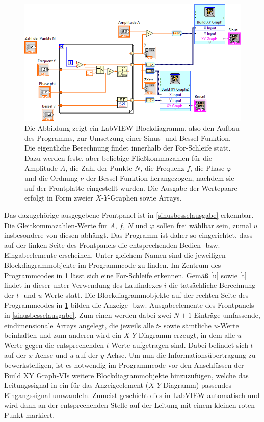 \documentclass[
a4paper,
12pt,
pagesize,
ngerman
]{scrartcl}
\begin{document}
	\begin{figure}[H]
		\centering
		\includegraphics[width=1.0\textwidth]{EIRE2018Dateien/Tag1/sinusbessel-bilder/SinusBesseld}
		\caption{Die Abbildung zeigt ein LabVIEW-Blockdiagramm, also den Aufbau des Programms, zur Umsetzung einer Sinus- und Bessel-Funktion. Die eigentliche Berechnung findet innerhalb der For-Schleife statt. Dazu werden feste, aber beliebige Fließkommazahlen für die Amplitude $A$, die Zahl der Punkte $N$, die Frequenz $f$, die Phase $\varphi$ und die Ordnung $\nu$ der Bessel-Funktion herangezogen, nachdem sie auf der Frontplatte eingestellt wurden. Die Ausgabe der Wertepaare erfolgt in Form zweier $X$-$Y$-Graphen sowie Arrays.}
		\label{sinusbesselprogrammcode}
	\end{figure}

	\noindent Das dazugehörige ausgegebene Frontpanel ist in \cref{sinusbesselausgabe} erkennbar. Die Gleitkommazahlen-Werte für $A$, $f$, $N$ und $\varphi$ sollen frei wählbar sein, zumal $u$ insbesondere von diesen abhängt. Das Programm ist daher so eingerichtet, dass auf der linken Seite des Frontpanels die entsprechenden Bedien- bzw. Eingabeelemente erscheinen. Unter gleichem Namen sind die jeweiligen Blockdiagrammobjekte im Programmcode zu finden. Im Zentrum des Programmcodes in \cref{sinusbesselprogrammcode} lässt sich eine For-Schleife erkennen. Gemäß \cref{u} sowie \cref{t} findet in dieser unter Verwendung des Laufindexes $i$ die tatsächliche Berechnung der $t$- und $u$-Werte statt. Die Blockdiagrammobjekte auf der rechten Seite des Programmcodes in \cref{sinusbesselprogrammcode} bilden die Anzeige- bzw. Ausgabeelemente des Frontpanels in \cref{sinusbesselausgabe}. Zum einen werden dabei zwei $N+1$ Einträge umfassende, eindimensionale Arrays angelegt, die jeweils alle $t$- sowie sämtliche $u$-Werte beinhalten und zum anderen wird ein $X$-$Y$-Diagramm erzeugt, in dem alle $u$-Werte gegen die entsprechenden $t$-Werte aufgetragen sind.
	Dabei befindet sich $t$ auf der $x$-Achse und $u$ auf der $y$-Achse. 
	Um nun die Informationsübertragung zu bewerkstelligen, ist es notwendig im Programmcode vor den Anschlüssen der \glqq Build XY Graph\grqq -VIs weitere Blockdiagrammobjekte hinzuzufügen, welche das Leitungssignal in ein für das Anzeigeelement ($X$-$Y$-Diagramm) passendes Eingangssignal umwandeln. Zumeist geschieht dies in LabVIEW automatisch und wird dann an der entsprechenden Stelle auf der Leitung mit einem kleinen roten Punkt markiert.
\end{document}
